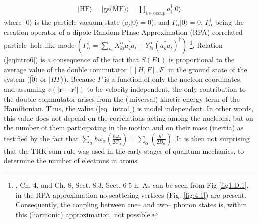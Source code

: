 \begin{align}
|\text{HF}\rangle=|\text{gs(MF)}\rangle=\prod_{i\in occup}a^\dagger_i |0\rangle
\end{align}
where $|0\rangle$ is the particle vacuum state ($a_j|0\rangle=0$), and $\Gamma_\alpha|\tilde 0\rangle=0$, $\Gamma^\dagger_\alpha$ being the creation operator of a dipole Random Phase Approximation (RPA) correlated particle--hole like mode $(\Gamma_\alpha^\dagger=\sum_{ki}X_{ki}^\alpha a_k^\dagger a_i+Y^\alpha_{ki}(a_k^\dagger a_i)^\dagger)$ \footnote{\cite{Bertsch:05}, Ch. 4, and \cite{Brink:05} Ch. 8, Sect. 8.3, \cite{Bohr:75} Sect. 6-5 h. As can be seen from Fig \ref{fig1.D.1}, in the RPA approximation no scattering vertices (Fig. \ref{fig:4.1}) are present. Consequently, the coupling between one-- and two-- phonon states is, within this (harmonic) approximation, not possible.}. Relation (\ref{eqintro6}) is a consequence of the fact that $S(E1)$ is proportional to the average value of the double  commutator $[[H,F],F]$in the ground state of the system ($|\tilde 0\rangle$ or $|HF\rangle$). Because $F$ is a function of only the nucleon coordinates, and assuming $v(|\mathbf{r}-\mathbf{r}'|)$ to be velocity independent, the only contribution to the double commutator arises from the (universal) kinetic energy term of the Hamiltonian. Thus, the value (\ref{eq_intro1}) is model independent. In other words, this value does not depend on the correlations acting among the nucleons, but on the number of them participating in the motion and on their mass (inertia) as testified by the fact that $\sum_{\alpha}\hbar \omega_\alpha\left(\frac{\hbar\omega_\alpha}{2C_\alpha}\right)=\sum_{\alpha}\left(\frac{\hbar^2}{2D_\alpha}\right)$. It is then not surprising that the TRK sum rule was used in the early stages of quantum mechanics, to determine the number of electrons in atoms.


